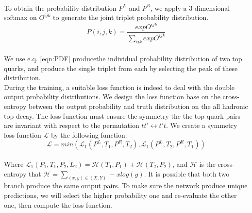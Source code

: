 \\
To obtain the probability distribution $P^{L}$ and $P^{R}$, we apply a 3-dimensional softmax on $O^{ijk}$ to generate the joint triplet probability distribution.
\\
\begin{equation}[h]\label{eqn:PDF}
	P(i,j,k) = \frac{exp O^{ijk}}{\sum_{ijk} exp O^{ijk}}
\end{equation}
\\
We use e.q. \ref{eqn:PDF} producethe individual probability distribution of two top quarks, and produce the single triplet from each by selecting the peak of these distribution. 
\\
During the training, a suitable loss function is indeed to deal with the double output probability distributions. We design the loss function base on the cross-entropy between the output probability and truth distribution on the all hadronic top decay. The loss function must ensure the symmetry the the top quark pairs are invariant with respect to the permutation $tt' \leftrightarrow t't$.  We create a symmetry loss function $\mathcal{L}$ by the following function:
\\
\begin{equation}
	\mathcal{L} = min(\mathcal{L}_{1}(P^{L}, T_{1}, P^{R}, T_{2}), \mathcal{L}_{1}(P^{L}, T_{2}, P^{R}, T_{1}))
\end{equation}
\\
Where $\mathcal{L}_{1}(P_{1}, T_{1}, P_{2}, L_{2}) = \mathcal{H}(T_{1}, P_{1}) +\mathcal{H}(T_{2}, P_{2})$, and $\mathcal{H}$ is the cross-entropy that $\mathcal{H} = \sum_{(x,y)\in (X,Y)} -xlog(y)$. It is possible that both two branch produce the same output pairs. To make sure the network produce unique predictions, we will select the higher probability one and re-evaluate the other one, then compute the loss function.











